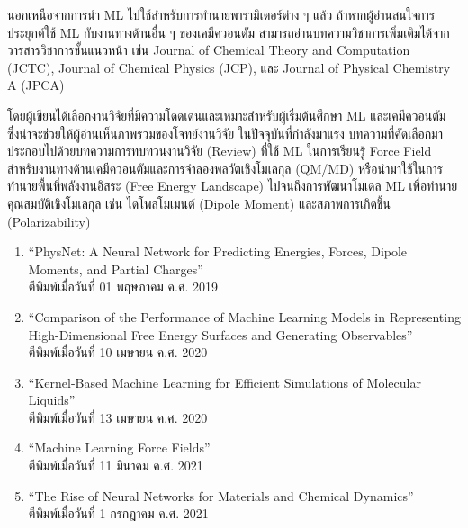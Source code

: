 นอกเหนือจากการนำ ML ไปใช้สำหรับการทำนายพารามิเตอร์ต่าง ๆ แล้ว ถ้าหากผู้อ่านสนใจการประยุกต์ใช้ ML กับงานทางด้านอื่น ๆ ของเคมีควอนตัม 
สามารถอ่านบทความวิชาการเพิ่มเติมได้จากวารสารวิชาการชั้นแนวหน้า เช่น Journal of Chemical Theory and Computation (JCTC), 
Journal of Chemical Physics (JCP), และ Journal of Physical Chemistry A (JPCA)

โดยผู้เขียนได้เลือกงานวิจัยที่มีความโดดเด่นและเหมาะสำหรับผู้เริ่มต้นศึกษา ML และเคมีควอนตัม ซึ่งน่าจะช่วยให้ผู้อ่านเห็นภาพรวมของโจทย์งานวิจัย%
ในปัจจุบันที่กำลังมาแรง บทความที่คัดเลือกมาประกอบไปด้วยบทความการทบทวนงานวิจัย (Review) ที่ใช้ ML ในการเรียนรู้ Force Field 
สำหรับงานทางด้านเคมีควอนตัมและการจําลองพลวัตเชิงโมเลกุล (QM/MD) หรือนำมาใช้ในการทำนายพื้นที่พลังงานอิสระ (Free Energy Landscape)
ไปจนถึงการพัฒนาโมเดล ML เพื่อทำนายคุณสมบัติเชิงโมเลกุล เช่น ไดโพลโมเมนต์ (Dipole Moment) และสภาพการเกิดขึ้น (Polarizability)

\begin{enumerate}
    \item \enquote{PhysNet: A Neural Network for Predicting Energies, Forces, Dipole Moments, and 
    Partial Charges}\cite{unke2019}\\
    ตีพิมพ์เมื่อวันที่ 01 พฤษภาคม ค.ศ. 2019
    
    \item \enquote{Comparison of the Performance of Machine Learning Models in Representing High-Dimensional 
    Free Energy Surfaces and Generating Observables}\cite{cendagorta2020}\\
    ตีพิมพ์เมื่อวันที่ 10 เมษายน ค.ศ. 2020
    
    \item \enquote{Kernel-Based Machine Learning for Efficient Simulations of Molecular Liquids}\cite{scherer2020}\\
    ตีพิมพ์เมื่อวันที่ 13 เมษายน ค.ศ. 2020

    \item \enquote{Machine Learning Force Fields}\cite{unke2021}\\
    ตีพิมพ์เมื่อวันที่ 11 มีนาคม ค.ศ. 2021\\

    \item \enquote{The Rise of Neural Networks for Materials and Chemical Dynamics}\cite{kulichenko2021}\\
    ตีพิมพ์เมื่อวันที่ 1 กรกฎาคม ค.ศ. 2021\\

\end{enumerate}
